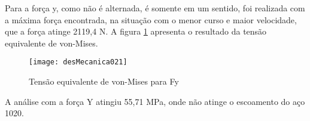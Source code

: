 		Para a força y, como não é alternada, é somente em um sentido, foi realizada com a máxima força encontrada, na situação com o menor curso e maior velocidade, que a força atinge 2119,4 N. A figura \ref{desMecanica021} apresenta o resultado da tensão equivalente de von-Mises.

		\newpage
		\begin{figure}[!h]
			\centering
			\texttt{[image: desMecanica021]}
			\caption{Tensão equivalente de von-Mises para Fy}
			\label{desMecanica021}
		\end{figure}

		A análise com a força Y atingiu 55,71 MPa, onde não atinge o escoamento do aço 1020.










